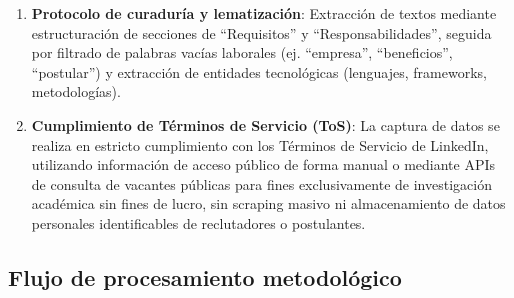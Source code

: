 \begin{enumerate}[label=\alph*.]
\begin{itemize}
        \item \textit{Exclusión}: Avisos duplicados, ofertas de pasantías o prácticas profesionales no remuneradas, solicitudes con descripciones genéricas sin requerimientos tecnológicos concretos, y vacantes orientadas puramente a ventas o gestión comercial sin exigencia técnica.
    \end{itemize}
    \item \textbf{Protocolo de curaduría y lematización}: Extracción de textos mediante estructuración de secciones de ``Requisitos'' y ``Responsabilidades'', seguida por filtrado de palabras vacías laborales (ej. ``empresa'', ``beneficios'', ``postular'') y extracción de entidades tecnológicas (lenguajes, frameworks, metodologías).
    \item \textbf{Cumplimiento de Términos de Servicio (ToS)}: La captura de datos se realiza en estricto cumplimiento con los Términos de Servicio de LinkedIn, utilizando información de acceso público de forma manual o mediante APIs de consulta de vacantes públicas para fines exclusivamente de investigación académica sin fines de lucro, sin scraping masivo ni almacenamiento de datos personales identificables de reclutadores o postulantes.
\end{enumerate}

\subsection{Flujo de procesamiento metodológico}
\label{app:flujo_metodologico}

